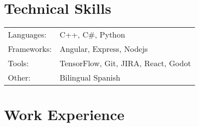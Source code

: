 \documentclass[a4paper,12pt]{article}
\begin{document}
\section{Technical Skills}
\begin{tabularx}{\linewidth}{@{}l X@{}}
    Languages: &  \normalsize{C++, C\#, Python}\\
    Frameworks: & \normalsize{Angular, Express, Nodejs}\\
    Tools: & \normalsize{TensorFlow, Git, JIRA, React, Godot}\\
    Other: & \normalsize{Bilingual\: Spanish}\\
\end{tabularx}

\section{Work Experience}
\end{document}

